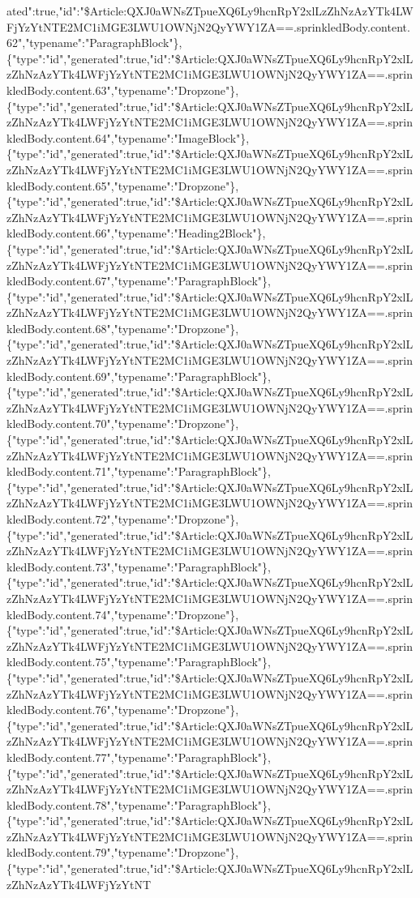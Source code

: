 ated":true,"id":"\$Article:QXJ0aWNsZTpueXQ6Ly9hcnRpY2xlLzZhNzAzYTk4LWFjYzYtNTE2MC1iMGE3LWU1OWNjN2QyYWY1ZA==.sprinkledBody.content.62","typename":"ParagraphBlock"\},\{"type":"id","generated":true,"id":"\$Article:QXJ0aWNsZTpueXQ6Ly9hcnRpY2xlLzZhNzAzYTk4LWFjYzYtNTE2MC1iMGE3LWU1OWNjN2QyYWY1ZA==.sprinkledBody.content.63","typename":"Dropzone"\},\{"type":"id","generated":true,"id":"\$Article:QXJ0aWNsZTpueXQ6Ly9hcnRpY2xlLzZhNzAzYTk4LWFjYzYtNTE2MC1iMGE3LWU1OWNjN2QyYWY1ZA==.sprinkledBody.content.64","typename":"ImageBlock"\},\{"type":"id","generated":true,"id":"\$Article:QXJ0aWNsZTpueXQ6Ly9hcnRpY2xlLzZhNzAzYTk4LWFjYzYtNTE2MC1iMGE3LWU1OWNjN2QyYWY1ZA==.sprinkledBody.content.65","typename":"Dropzone"\},\{"type":"id","generated":true,"id":"\$Article:QXJ0aWNsZTpueXQ6Ly9hcnRpY2xlLzZhNzAzYTk4LWFjYzYtNTE2MC1iMGE3LWU1OWNjN2QyYWY1ZA==.sprinkledBody.content.66","typename":"Heading2Block"\},\{"type":"id","generated":true,"id":"\$Article:QXJ0aWNsZTpueXQ6Ly9hcnRpY2xlLzZhNzAzYTk4LWFjYzYtNTE2MC1iMGE3LWU1OWNjN2QyYWY1ZA==.sprinkledBody.content.67","typename":"ParagraphBlock"\},\{"type":"id","generated":true,"id":"\$Article:QXJ0aWNsZTpueXQ6Ly9hcnRpY2xlLzZhNzAzYTk4LWFjYzYtNTE2MC1iMGE3LWU1OWNjN2QyYWY1ZA==.sprinkledBody.content.68","typename":"Dropzone"\},\{"type":"id","generated":true,"id":"\$Article:QXJ0aWNsZTpueXQ6Ly9hcnRpY2xlLzZhNzAzYTk4LWFjYzYtNTE2MC1iMGE3LWU1OWNjN2QyYWY1ZA==.sprinkledBody.content.69","typename":"ParagraphBlock"\},\{"type":"id","generated":true,"id":"\$Article:QXJ0aWNsZTpueXQ6Ly9hcnRpY2xlLzZhNzAzYTk4LWFjYzYtNTE2MC1iMGE3LWU1OWNjN2QyYWY1ZA==.sprinkledBody.content.70","typename":"Dropzone"\},\{"type":"id","generated":true,"id":"\$Article:QXJ0aWNsZTpueXQ6Ly9hcnRpY2xlLzZhNzAzYTk4LWFjYzYtNTE2MC1iMGE3LWU1OWNjN2QyYWY1ZA==.sprinkledBody.content.71","typename":"ParagraphBlock"\},\{"type":"id","generated":true,"id":"\$Article:QXJ0aWNsZTpueXQ6Ly9hcnRpY2xlLzZhNzAzYTk4LWFjYzYtNTE2MC1iMGE3LWU1OWNjN2QyYWY1ZA==.sprinkledBody.content.72","typename":"Dropzone"\},\{"type":"id","generated":true,"id":"\$Article:QXJ0aWNsZTpueXQ6Ly9hcnRpY2xlLzZhNzAzYTk4LWFjYzYtNTE2MC1iMGE3LWU1OWNjN2QyYWY1ZA==.sprinkledBody.content.73","typename":"ParagraphBlock"\},\{"type":"id","generated":true,"id":"\$Article:QXJ0aWNsZTpueXQ6Ly9hcnRpY2xlLzZhNzAzYTk4LWFjYzYtNTE2MC1iMGE3LWU1OWNjN2QyYWY1ZA==.sprinkledBody.content.74","typename":"Dropzone"\},\{"type":"id","generated":true,"id":"\$Article:QXJ0aWNsZTpueXQ6Ly9hcnRpY2xlLzZhNzAzYTk4LWFjYzYtNTE2MC1iMGE3LWU1OWNjN2QyYWY1ZA==.sprinkledBody.content.75","typename":"ParagraphBlock"\},\{"type":"id","generated":true,"id":"\$Article:QXJ0aWNsZTpueXQ6Ly9hcnRpY2xlLzZhNzAzYTk4LWFjYzYtNTE2MC1iMGE3LWU1OWNjN2QyYWY1ZA==.sprinkledBody.content.76","typename":"Dropzone"\},\{"type":"id","generated":true,"id":"\$Article:QXJ0aWNsZTpueXQ6Ly9hcnRpY2xlLzZhNzAzYTk4LWFjYzYtNTE2MC1iMGE3LWU1OWNjN2QyYWY1ZA==.sprinkledBody.content.77","typename":"ParagraphBlock"\},\{"type":"id","generated":true,"id":"\$Article:QXJ0aWNsZTpueXQ6Ly9hcnRpY2xlLzZhNzAzYTk4LWFjYzYtNTE2MC1iMGE3LWU1OWNjN2QyYWY1ZA==.sprinkledBody.content.78","typename":"ParagraphBlock"\},\{"type":"id","generated":true,"id":"\$Article:QXJ0aWNsZTpueXQ6Ly9hcnRpY2xlLzZhNzAzYTk4LWFjYzYtNTE2MC1iMGE3LWU1OWNjN2QyYWY1ZA==.sprinkledBody.content.79","typename":"Dropzone"\},\{"type":"id","generated":true,"id":"\$Article:QXJ0aWNsZTpueXQ6Ly9hcnRpY2xlLzZhNzAzYTk4LWFjYzYtNT